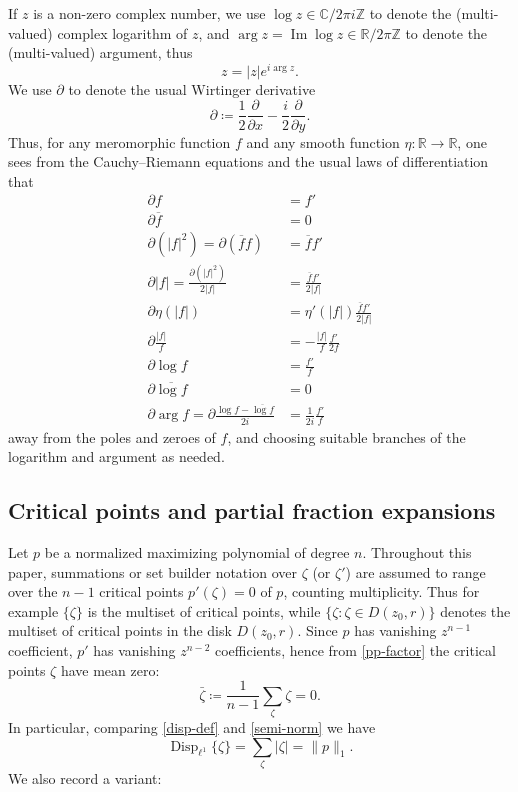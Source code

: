 \documentclass[12pt]{amsart}
\newcommand{\R}{\mathbb{R}}
\newcommand{\C}{\mathbb{C}}
\newcommand{\Z}{\mathbb{Z}}
\renewcommand{\arg}{\operatorname{arg}}
\newcommand{\Disp}{\operatorname{Disp}_{\ell^1}}
\renewcommand{\Im}{\operatorname{Im}}
\begin{document}
If $z$ is a non-zero complex number, we use $\log z \in \C / 2\pi i\Z$ to denote the (multi-valued) complex logarithm of $z$, and $\arg z = \Im \log z \in \R/2\pi\Z$ to denote the (multi-valued) argument, thus
$$ z = |z| e^{i \arg z}.$$
We use $\partial$ to denote the usual Wirtinger derivative
$$ \partial \coloneqq \frac{1}{2} \frac{\partial}{\partial x} - \frac{i}{2} \frac{\partial}{\partial y}.$$
Thus, for any meromorphic function $f$ and any smooth function $\eta \colon \R \to \R$, one sees from the Cauchy--Riemann equations and the usual laws of differentiation that
\begin{align}
    \partial f &= f' \label{wirt-1}\\
    \partial \overline{f} &= 0 \label{wirt-2}\\
    \partial (|f|^2) = \partial (\overline{f} f) &= \overline{f} f' \label{wirt-3}\\
    \partial |f| = \frac{\partial (|f|^2)}{2|f|} &= \frac{\overline{f} f'}{2|f|} \label{wirt-4}\\
    \partial \eta(|f|) &= \eta'(|f|) \frac{\overline{f} f'}{2|f|} \label{wirt-5} \\
    \partial \frac{|f|}{f} &= - \frac{|f|}{f} \frac{f'}{2f} \label{wirt-6} \\
    \partial \log f &= \frac{f'}{f} \label{wirt-7}\\
    \partial \overline{\log f} &= 0 \label{wirt-8}\\
    \partial \arg f = \partial \frac{\log f - \overline{\log f}}{2i} &= \frac{1}{2i} \frac{f'}{f} \label{wirt-9}
\end{align}
away from the poles and zeroes of $f$, and choosing suitable branches of the logarithm and argument as needed.

\subsection{Critical points and partial fraction expansions}\label{disp-sec}

Let $p$ be a normalized maximizing polynomial of degree $n$. Throughout this paper, summations or set builder notation over $\zeta$ (or $\zeta'$) are assumed to range over the $n-1$ critical points $p'(\zeta)=0$ of $p$, counting multiplicity.  Thus for example $\{\zeta\}$ is the multiset of critical points, while $\{\zeta: \zeta \in D(z_0,r)\}$ denotes the multiset of critical points in the disk $D(z_0,r)$.  Since $p$ has vanishing $z^{n-1}$ coefficient, $p'$ has vanishing $z^{n-2}$ coefficients, hence from \eqref{pp-factor} the critical points $\zeta$ have mean zero:
\begin{equation}\label{zeta-mean}
\bar \zeta \coloneqq \frac{1}{n-1} \sum_\zeta \zeta = 0.
\end{equation}
In particular, comparing \eqref{disp-def} and \eqref{semi-norm} we have
\begin{equation}\label{disp-zeta}
    \Disp \{\zeta\} = \sum_\zeta |\zeta| = \|p\|_1.
\end{equation}
We also record a variant:
\end{document}
